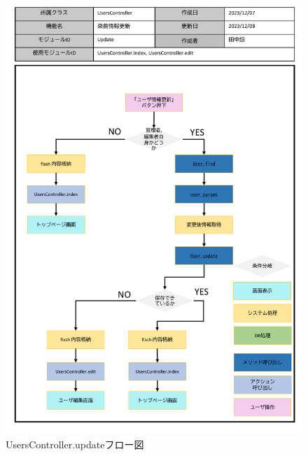 \begin{figure}
    \centering
    \includegraphics[scale=0.6]{img/Users/pptx/UsersController_update.pdf}
    \caption{UsersController.updateフロー図}
\end{figure}

\clearpage

